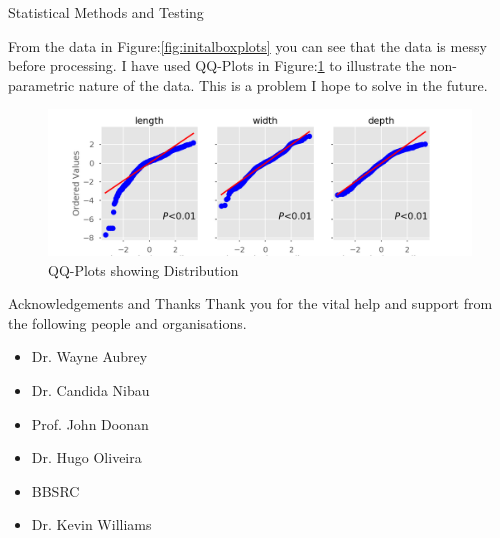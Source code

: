 \documentclass[final]{beamer}
\begin{document}
\begin{frame}{}
\begin{textblock}{27.7}
\begin{block}{Statistical Methods and Testing}
\begin{multicols}{2}
      \end{multicols}

      From the data in Figure:\ref{fig:initalboxplots} you can see that the data is
      messy before processing. I have used QQ-Plots in Figure:\ref{fig:qq} to illustrate
      the non-parametric nature of the data. This is a problem I hope to solve in the future.
        \begin{figure}[htb]
          \centering
          \includegraphics[width=22cm]{qqplots.png}
          \caption{\label{fig:qq} QQ-Plots showing Distribution}
        \end{figure}       
      
    \end{block}
    
    
    \begin{block}{Acknowledgements and Thanks}
      Thank you for the vital help and support from the following people and organisations.

      \begin{multicols}{3}

        \begin{itemize}
        \item{Dr. Wayne Aubrey}
        \item{Dr. Candida Nibau}

        \end{itemize}

        \columnbreak

        \begin{itemize}
        \item{Prof. John Doonan}
        \item{Dr. Hugo Oliveira}

        \end{itemize}

        \columnbreak
        
        \begin{itemize}
        \item{BBSRC}
        \item{Dr. Kevin Williams}
        \end{itemize}
        

\end{multicols}
\end{block}
\end{textblock}
\end{frame}
\end{document}
